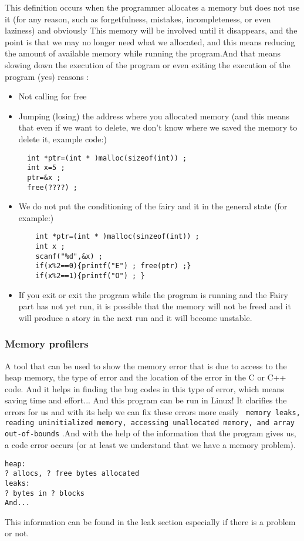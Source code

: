 \documentclass[12pt]{article}
\begin{document}
This definition occurs when the programmer allocates a memory but does not use it (for any reason, such as forgetfulness, mistakes, incompleteness, or even laziness) and obviously This memory will be involved until it disappears, and the point is that we may no longer need what we allocated, and this means reducing the amount of available memory while running the program.And that means slowing down the execution of the program or even exiting the execution of the program (yes)
\newpage
 reasons :
\begin{itemize}
  \item Not calling for free
  \item Jumping (losing) the address where you allocated memory (and this means that even if we want to delete, we don't know where we saved the memory to delete it, example code:)\newline
  \begin{lstlisting}
  int *ptr=(int * )malloc(sizeof(int)) ;
  int x=5 ;
  ptr=&x ;
  free(????) ;
  \end{lstlisting}
  \item We do not put the conditioning of the fairy and it in the general state (for example:)\newline
  \begin{lstlisting}
    int *ptr=(int * )malloc(sinzeof(int)) ;
    int x ;
    scanf("%d",&x) ;
    if(x%2==0){printf("E") ; free(ptr) ;}
    if(x%2==1){printf("O") ; }
  \end{lstlisting}
  \item If you exit or exit the program while the program is running and the Fairy part has not yet run, it is possible that the memory will not be freed and it will produce a story in the next run and it will become unstable.


\end{itemize}

\subsubsection{Memory profilers}
A tool that can be used to show the memory error that is due to access to the heap memory, the type of error and the location of the error in the C or C++ code.
And it helps in finding the bug codes in this type of error, which means saving time and effort...\newline
And this program can be run in Linux!\newline
It clarifies the errors for us and with its help we can fix these errors more easily
\texttt{ memory leaks, reading uninitialized memory, accessing unallocated memory, and array out-of-bounds}
.And with the help of the information that the program gives us, a code error occurs (or at least we understand that we have a memory problem).
\begin{lstlisting}
heap:
? allocs, ? free bytes allocated
leaks:
? bytes in ? blocks
And...
\end{lstlisting}
This information can be found in the leak section especially if there is a problem or not.
\end{document}

